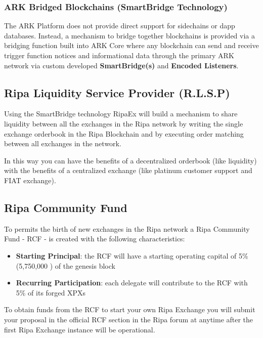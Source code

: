 \documentclass[11pt,fleqn,oneside]{book} %
\begin{document}
\subsubsection{ARK Bridged Blockchains (SmartBridge Technology)}
The ARK Platform does not provide direct support for sidechains or dapp databases.
Instead, a mechanism to bridge together blockchains is provided via a bridging
function built into ARK Core where any blockchain can send and receive trigger
function notices and informational data through the primary ARK network via
custom developed \textbf{SmartBridge(s)} and \textbf{Encoded Listeners}.

\subsection{Ripa Liquidity Service Provider (R.L.S.P)}
Using the SmartBridge technology RipaEx will build a mechanism to share liquidity between all the exchanges in the Ripa network
by writing the single exchange orderbook in the Ripa Blockchain and by executing order matching between all exchanges in the network.

In this way you can have the benefits of a decentralized orderbook (like liquidity) with the benefits of a centralized exchange (like
platinum customer support and FIAT exchange).

\subsection{Ripa Community Fund}
To permits the birth of new exchanges in the Ripa network a Ripa Community Fund - RCF - is created with the following characteristics:
\begin{itemize}
	\item \textbf{Starting Principal}: the RCF will have a starting operating capital of 5\% (5,750,000 \PHP) of the genesis block
	\item \textbf{Recurring Participation}: each delegate will contribute to the RCF with 5\% of its forged XPXs
\end{itemize}
\vspace{5mm}
To obtain funds from the RCF to start your own Ripa Exchange you will submit your proposal in the official RCF section in the Ripa forum at
anytime after the first Ripa Exchange instance will be operational.

\end{document}
